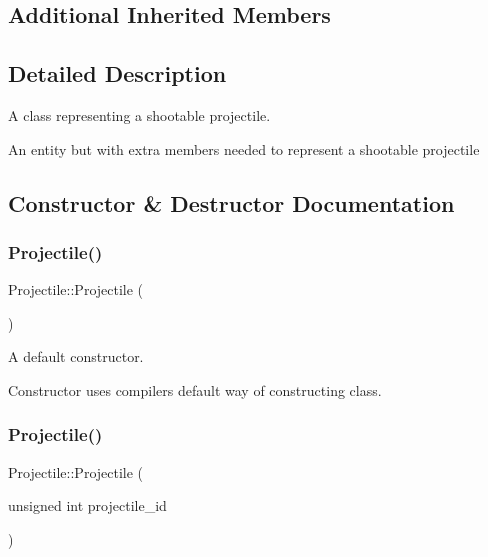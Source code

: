\subsection*{Additional Inherited Members}


\subsection{Detailed Description}
A class representing a shootable projectile. 

An entity but with extra members needed to represent a shootable projectile 

\subsection{Constructor \& Destructor Documentation}
\mbox{\label{classProjectile_af8b4c110af08163aeca99610e3906311}} 
\subsubsection{\texorpdfstring{Projectile()}{Projectile()}\hspace{0.1cm}{\footnotesize\ttfamily [1/2]}}
{\footnotesize\ttfamily Projectile\+::\+Projectile (\begin{DoxyParamCaption}{ }\end{DoxyParamCaption})\hspace{0.3cm}{\ttfamily [default]}}



A default constructor. 

Constructor uses compiler\textquotesingle{}s default way of constructing class. \mbox{\label{classProjectile_a7b321cb748e1c2fbe83a44d4f9ec2576}} 
\subsubsection{\texorpdfstring{Projectile()}{Projectile()}\hspace{0.1cm}{\footnotesize\ttfamily [2/2]}}
{\footnotesize\ttfamily Projectile\+::\+Projectile (\begin{DoxyParamCaption}\item[{unsigned int}]{projectile\+\_\+id }\end{DoxyParamCaption})}

